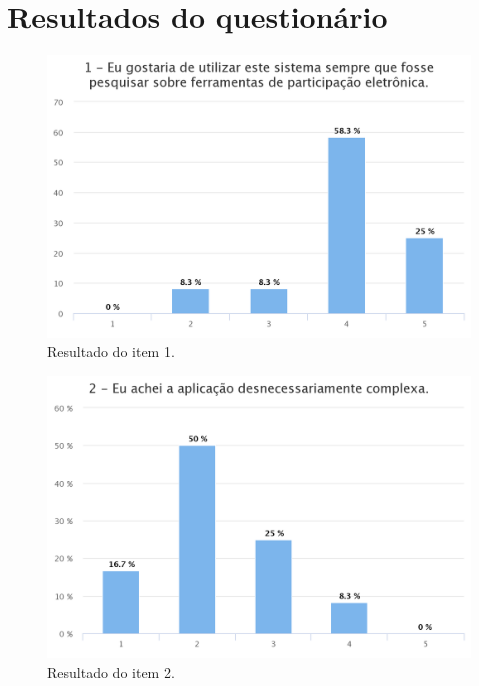 \chapter{Resultados do questionário}
\label{apendice:a}

\begin{figure}[!ht]
    \centering
    \includegraphics[scale=0.3]{./figuras/q1-hc.png}
    \caption{Resultado do item 1.}
    \label{fig:q1}
\end{figure}

\begin{figure}[!ht]
    \centering
    \includegraphics[scale=0.3]{./figuras/q2-hc.png}
    \caption{Resultado do item 2.}
    \label{fig:q2}
\end{figure}

